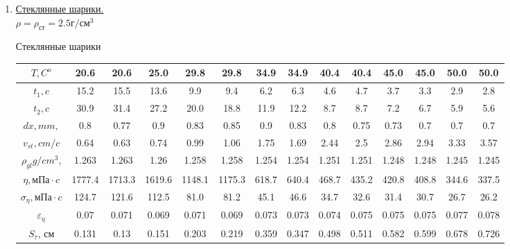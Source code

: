 \documentclass[10pt]{article}
\begin{document}
\begin{enumerate}
    \item \underline{Стеклянные шарики.} \\
    $\rho = \rho_{\text{ст}} = 2.5 \text{г}/\text{см}^3$
    \begin{table}[htp]
                    Стеклянные шарики\\
                    \begin{tabular}{|c|c|c|c|c|c|c|c|c|c|c|c|c|c|}
                            \hline
                                $ T , C^o$  &20.6 &20.6 &25.0 &29.8 &29.8 &34.9 &34.9 &40.4 &40.4 &45.0 &45.0 &50.0 &50.0 \\
                            \hline
                                $ t_1 , c$   &15.2 &15.5 &13.6 &9.9 &9.4 &6.2 &6.3 &4.6 &4.7 &3.7 &3.3 &2.9 &2.8\\
                            \hline
                                $ t_2 , c$ &30.9 &31.4 &27.2 &20.0 &18.8 &11.9 &12.2 &8.7 &8.7 &7.2 &6.7 &5.9 &5.6\\
                            \hline
                                $ dx, mm, $ &0.8 &0.77 &0.9 &0.83 &0.85 &0.9 &0.83 &0.8 &0.75 &0.73 &0.7 &0.7 &0.7 \\
                            \hline
                                $v_{st}, cm/c$ &0.64 &0.63 &0.74 &0.99 &1.06 &1.75 &1.69 &2.44 &2.5 &2.86 &2.94 &3.33 &3.57 \\
                            \hline
                                $\rho_{gl} g/cm^3$, &1.263 &1.263 &1.26 &1.258 &1.258 &1.254 &1.254 &1.251 &1.251 &1.248 &1.248 &1.245 &1.245 \\ 
                            \hline
                                $\eta , \text{мПа} \cdot c$ &1777.4 &1713.3 &1619.6 &1148.1 &1175.3 &618.7 &640.4 &468.7 &435.2 &420.8 &408.8 &344.6 &337.5 \\
                            \hline
                                $\sigma_{\eta} , \text{мПа} \cdot c$ &124.7 &121.6 &112.5 &81.0 &81.2 &45.1 &46.6 &34.7 &32.6 &31.4 &30.7 &26.7 &26.2 \\
                            \hline
                                $\varepsilon_{\eta}$ &0.07 &0.071 &0.069  &0.071 &0.069 &0.073 &0.073 &0.074 &0.075 &0.075 &0.075 &0.077 &0.078 \\
                            \hline
                                $S_{\tau}$, см &0.131 &0.13 &0.151 &0.203 &0.219 &0.359 &0.347 &0.498 &0.511 &0.582 &0.599 &0.678 &0.726 \\

\end{tabular}
\end{table}
\end{enumerate}
\end{document}

